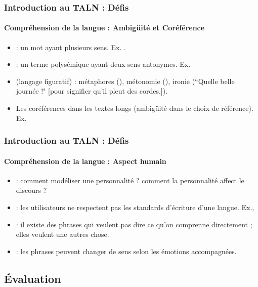 \documentclass[xcolor=table]{beamer}
\begin{document}
\begin{frame}
\frametitle{Introduction au TALN : Défis}
\framesubtitle{Compréhension de la langue : Ambigüité et Coréférence}

\begin{itemize}
	\item {} : un mot ayant plusieurs sens. 
	Ex. .
	\item {} : un terme polysémique ayant deux sens antonymes. 
	Ex. 
	\item {} (langage figuratif) : métaphores (), métonomie (), ironie (``Quelle belle journée !" [pour signifier qu'il pleut des cordes.]).
	\item Les coréférences dans les textes longs (ambigüité dans le choix de référence). 
	Ex. 
\end{itemize}

\end{frame}

\begin{frame}
\frametitle{Introduction au TALN : Défis}
\framesubtitle{Compréhension de la langue : Aspect humain}

\begin{itemize}
	\item {} : comment modéliser une personnalité ? comment la personnalité affect le discours ?
	\item {} : les utilisateurs ne respectent pas les standards d'écriture d'une langue. Ex., 
	\item {} : il existe des phrases qui veulent pas dire ce qu'on comprenne directement ; elles veulent une autres chose.
	\item {} : les phrases peuvent changer de sens selon les émotions accompagnées.
\end{itemize}

\end{frame}


\subsection{Évaluation}
\end{document}
